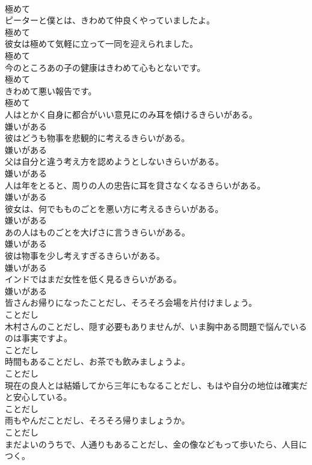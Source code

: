 \documentclass[8pt]{extreport}
\begin{document}
\begin{CJK}{UTF8}{min}
\\	極めて
\\	ピーターと僕とは、きわめて仲良くやっていましたよ。	
\\	極めて
\\	彼女は極めて気軽に立って一同を迎えられました。	
\\	極めて
\\	今のところあの子の健康はきわめて心もとないです。	
\\	極めて
\\	きわめて悪い報告です。	
\\	極めて
\\	人はとかく自身に都合がいい意見にのみ耳を傾けるきらいがある。	
\\	嫌いがある
\\	彼はどうも物事を悲観的に考えるきらいがある。	
\\	嫌いがある
\\	父は自分と違う考え方を認めようとしないきらいがある。	
\\	嫌いがある
\\	人は年をとると、周りの人の忠告に耳を貸さなくなるきらいがある。	
\\	嫌いがある
\\	彼女は、何でもものごとを悪い方に考えるきらいがある。	
\\	嫌いがある
\\	あの人はものごとを大げさに言うきらいがある。	
\\	嫌いがある
\\	彼は物事を少し考えすぎるきらいがある。	
\\	嫌いがある
\\	インドではまだ女性を低く見るきらいがある。	
\\	嫌いがある
\\	皆さんお帰りになったことだし、そろそろ会場を片付けましょう。	
\\	ことだし
\\	木村さんのことだし、隠す必要もありませんが、いま胸中ある問題で悩んでいるのは事実ですよ。	
\\	ことだし
\\	時間もあることだし、お茶でも飲みましょうよ。	
\\	ことだし
\\	現在の良人とは結婚してから三年にもなることだし、もはや自分の地位は確実だと安心している。	
\\	ことだし
\\	雨もやんだことだし、そろそろ帰りましょうか。	
\\	ことだし
\\	まだよいのうちで、人通りもあることだし、金の像などもって歩いたら、人目につく。	

\end{CJK}
\end{document}
